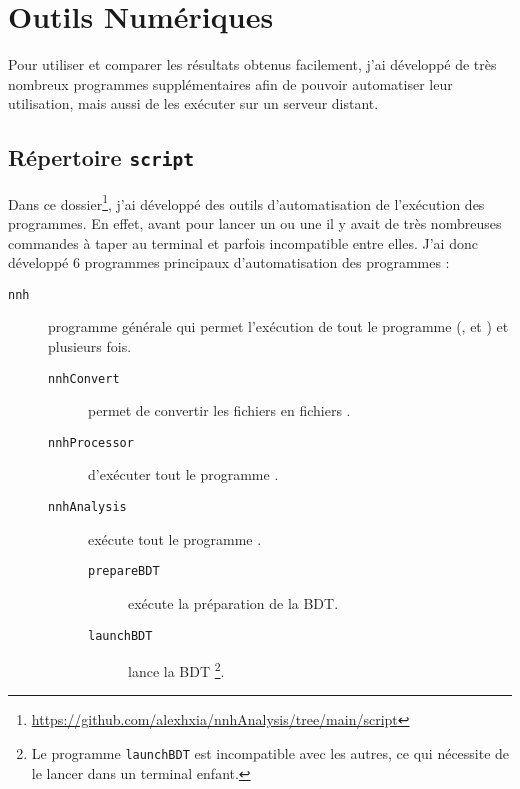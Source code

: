 

\chapter{Outils Numériques}

Pour utiliser et comparer les résultats obtenus facilement, j'ai développé de très nombreux programmes supplémentaires afin de pouvoir automatiser leur utilisation, mais aussi de les exécuter sur un serveur distant. 

\section{Répertoire \texttt{script}}

Dans ce dossier\footnote{\url{https://github.com/alexhxia/nnhAnalysis/tree/main/script}}, j'ai développé des outils d'automatisation de l'exécution des programmes. En effet, avant pour lancer un \processor ou une \analysis il y avait de très nombreuses commandes à taper au terminal et parfois incompatible entre elles.
J'ai donc développé 6 programmes principaux d'automatisation des programmes :

\begin{description}
	
	\item[\texttt{nnh}]	programme générale qui permet l'exécution de tout le programme (\convert, \processor et \analysis) et plusieurs fois.
	\begin{description}

	\item[\texttt{nnhConvert}] permet de convertir les fichiers \SLCIO en fichiers \ROOT.
	
	\item[\texttt{nnhProcessor}] d'exécuter tout le programme \processor.
	
	\item[\texttt{nnhAnalysis}] exécute tout le programme \analysis.
	
	\begin{description}
		
		\item[\texttt{prepareBDT}] exécute la préparation de la BDT.
		
		\item[\texttt{launchBDT}] lance la BDT \footnote{Le programme \texttt{launchBDT} est incompatible avec les autres, ce qui nécessite de le lancer dans un terminal enfant.}.
		
	\end{description}
	\end{description}
	
\end{description}

